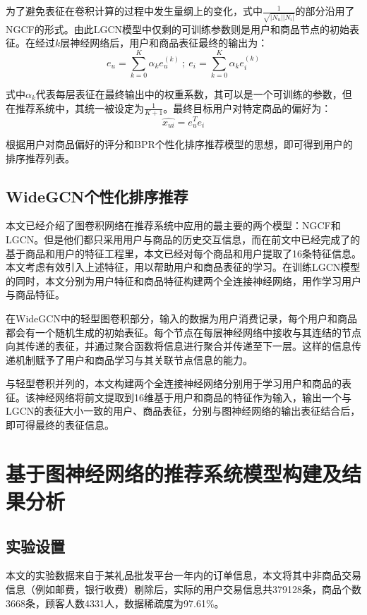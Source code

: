 \documentclass[lang=cn,11pt,a4paper,cite=authoryear]{elegantpaper}
\begin{document}
为了避免表征在卷积计算的过程中发生量纲上的变化，式中$\frac{1}{\sqrt{|N_u||N_i|}}$的部分沿用了NGCF的形式。由此LGCN模型中仅剩的可训练参数则是用户和商品节点的初始表征。在经过$k$层神经网络后，用户和商品表征最终的输出为：
\begin{equation}
  e_u = \sum_{k=0}^K\alpha_ke_u^{(k)} \ ; \ e_i = \sum_{k=0}^K\alpha_ke_i^{(k)}
\end{equation}

式中$\alpha_k$代表每层表征在最终输出中的权重系数，其可以是一个可训练的参数，但在推荐系统中，其统一被设定为$\frac{1}{K+1}$。最终目标用户对特定商品的偏好为：
\begin{equation}
  \hat{x_{ui}} = e_u^Te_i
\end{equation}

根据用户对商品偏好的评分和BPR个性化排序推荐模型的思想，即可得到用户的排序推荐列表。

\subsection{WideGCN个性化排序推荐}
本文已经介绍了图卷积网络在推荐系统中应用的最主要的两个模型：NGCF和LGCN。但是他们都只采用用户与商品的历史交互信息，而在前文中已经完成了的基于商品和用户的特征工程里，本文已经对每个商品和用户提取了16条特征信息。本文考虑有效引入上述特征，用以帮助用户和商品表征的学习。在训练LGCN模型的同时，本文分别为用户特征和商品特征构建两个全连接神经网络，用作学习用户与商品特征。

在WideGCN中的轻型图卷积部分，输入的数据为用户消费记录，每个用户和商品都会有一个随机生成的初始表征。每个节点在每层神经网络中接收与其连结的节点向其传递的表征，并通过聚合函数将信息进行聚合并传递至下一层。这样的信息传递机制赋予了用户和商品学习与其关联节点信息的能力。

与轻型卷积并列的，本文构建两个全连接神经网络分别用于学习用户和商品的表征。该神经网络将前文提取到16维基于用户和商品的特征作为输入，输出一个与LGCN的表征大小一致的用户、商品表征，分别与图神经网络的输出表征结合后，即可得最终的表征信息。

\section{基于图神经网络的推荐系统模型构建及结果分析}
\subsection{实验设置}
本文的实验数据来自于某礼品批发平台一年内的订单信息，本文将其中非商品交易信息（例如邮费，银行收费）剔除后，实际的用户交易信息共379128条，商品个数3668条，顾客人数4331人，数据稀疏度为97.61\%。
\end{document}
